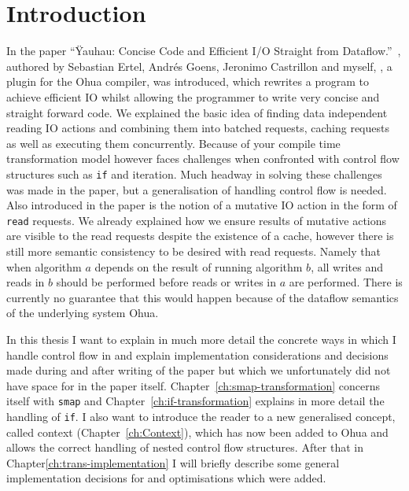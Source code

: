 \chapter{Introduction}

\label{ch:Intro}



In the paper ``Ÿauhau: Concise Code and Efficient I/O Straight from Dataflow.''~\cite{ErtelGoensAdamEtAl2016}, authored by Sebastian Ertel, Andrés Goens, Jeronimo Castrillon and myself, \yauhau{}, a plugin for the Ohua\cite{Ertel:2015:OID:2807426.2807431}\cite{Ohua:library:link} compiler, was introduced, which rewrites a program to achieve efficient IO whilst allowing the programmer to write very concise and straight forward code.
We explained the basic idea of finding data independent reading IO actions and combining them into batched requests, caching requests as well as executing them concurrently.
Because of your compile time transformation model however \yauhau{} faces challenges when confronted with control flow structures such as \texttt{if} and iteration.
Much headway in solving these challenges was made in the paper, but a generalisation of handling control flow is needed.
Also introduced in the paper is the notion of a mutative IO action in the form of \texttt{read} requests.
We already explained how we ensure results of mutative actions are visible to the read requests despite the existence of a cache, however there is still more semantic consistency to be desired with read requests.
Namely that when algorithm $a$ depends on the result of running algorithm $b$, all writes and reads in $b$ should be performed before reads or writes in $a$ are performed.
There is currently no guarantee that this would happen because of the dataflow semantics of the underlying system Ohua.

In this thesis I want to explain in much more detail the concrete ways in which I handle control flow in \yauhau{} and explain implementation considerations and decisions made during and after writing of the paper but which we unfortunately did not have space for in the paper itself.
Chapter~\ref{ch:smap-transformation} concerns itself with \texttt{smap} and Chapter~\ref{ch:if-transformation} explains in more detail the handling of \texttt{if}.
I also want to introduce the reader to a new generalised concept, called context (Chapter~\ref{ch:Context}), which has now been added to Ohua and allows the correct handling of nested control flow structures.
After that in Chapter\ref{ch:trans-implementation} I will briefly describe some general implementation decisions for \yauhau{} and optimisations which were added.


